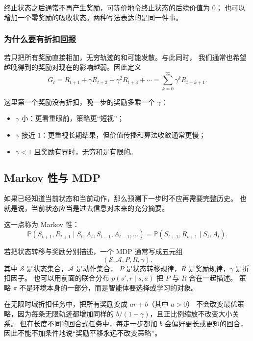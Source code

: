 \documentclass[11pt,a4paper,fontset=fandol]{ctexart}
\newcommand{\Sset}{\mathcal{S}}
\newcommand{\Aset}{\mathcal{A}}
\newcommand{\Prob}{\mathbb{P}}
\begin{document}
终止状态之后通常不再产生奖励，可等价地令终止状态的后续价值为 \(0\)；
也可以增加一个零奖励的吸收状态。两种写法表达的是同一件事。

\subsubsection{为什么要有折扣回报}

若只把所有奖励直接相加，无穷轨迹的和可能发散。与此同时，
我们通常也希望越晚得到的奖励对现在的影响越弱。因此定义
\[
G_t
=R_{t+1}+\gamma R_{t+2}+\gamma^2R_{t+3}+\cdots
=\sum_{k=0}^{\infty}\gamma^kR_{t+k+1}.
\]

这里第一个奖励没有折扣，晚一步的奖励多乘一个 \(\gamma\)：

\begin{itemize}
  \item \(\gamma\) 小：更看重眼前，策略更“短视”；
  \item \(\gamma\) 接近 \(1\)：更重视长期结果，但价值传播和算法收敛通常更慢；
  \item \(\gamma<1\) 且奖励有界时，无穷和是有限的。
\end{itemize}

\subsection{Markov 性与 MDP}

\begin{intuitionbox}
如果已经知道当前状态和当前动作，那么预测下一步时不应再需要完整历史。
也就是说，当前状态应当是过去信息对未来的充分摘要。
\end{intuitionbox}

这一点称为 Markov 性：
\[
\Prob(S_{t+1},R_{t+1}\mid S_t,A_t,S_{t-1},A_{t-1},\ldots)
=
\Prob(S_{t+1},R_{t+1}\mid S_t,A_t).
\]

若把状态转移与奖励分别描述，一个 MDP 通常写成五元组
\[
\boxed{(\Sset,\Aset,P,R,\gamma)}.
\]
其中 \(\Sset\) 是状态集合，\(\Aset\) 是动作集合，
\(P\) 是状态转移规律，\(R\) 是奖励规律，\(\gamma\) 是折扣因子。
也可以用前面的联合分布 \(p(s',r\mid s,a)\) 把 \(P\) 与 \(R\) 合在一起描述。
策略 \(\pi\) 不是环境本身的一部分，而是智能体要选择或学习的对象。

\begin{warningbox}
在无限时域折扣任务中，把所有奖励变成 \(ar+b\)（其中 \(a>0\)）
不会改变最优策略，因为每条无限轨迹都增加同样的
\(b/(1-\gamma)\)，且正比例缩放不改变大小关系。
但在长度不同的回合式任务中，每走一步都加 \(b\) 会偏好更长或更短的回合，
因此不能不加条件地说“奖励平移永远不改变策略”。
\end{warningbox}
\end{document}
